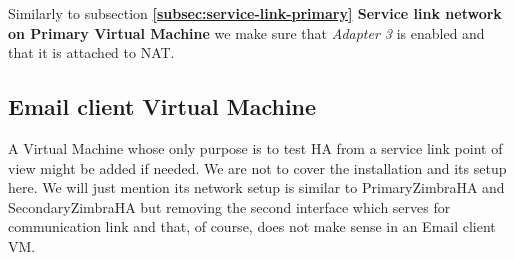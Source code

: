 Similarly to subsection \textbf{\ref{subsec:service-link-primary} Service link network on Primary Virtual Machine} we make sure that \textit{Adapter 3} is enabled and that it is attached to NAT.

\subsection {Email client Virtual Machine}
A Virtual Machine whose only purpose is to test HA from a service link point of view might be added if needed. We are not to cover the installation and its setup here. We will just mention its network setup is similar to PrimaryZimbraHA and SecondaryZimbraHA but removing the second interface which serves for communication link and that, of course, does not make sense in an Email client VM.